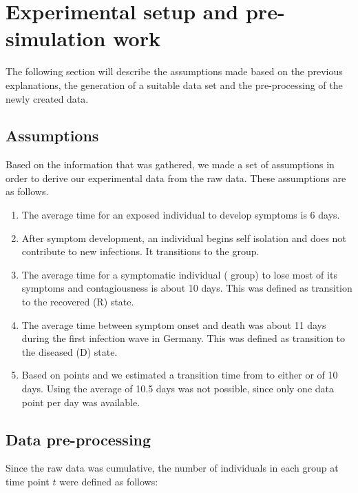 
\section{Experimental setup and pre-simulation work}
The following section will describe the assumptions made based on the previous explanations, the generation of a suitable data set and
the pre-processing of the newly created data.


\subsection{Assumptions}
Based on the information that was gathered, we made a set of assumptions in order to derive our experimental data from the raw data.
These assumptions are as follows.

\begin{enumerate}
	\item The average time for an exposed individual to develop symptoms is 6 days.
	\item After symptom development, an individual begins self isolation and does not contribute to new infections. It transitions to the  group.
	\item The average time for a symptomatic individual ( group) to lose most of its symptoms and contagiousness is about 10 days. This was defined as
		transition to the recovered (R) state.
	\item The average time between symptom onset and death was about 11 days during the first infection wave in Germany. This was
		defined as transition to the diseased (D) state.
	\item Based on points  and  we estimated a transition time from  to either  or  of 10 days. Using the
		average of 10.5 days was not possible, since only one data point per day was available.
\end{enumerate}


\subsection{Data pre-processing}
Since the raw data was cumulative, the number of individuals in each group at time point $t$ were defined as follows:

